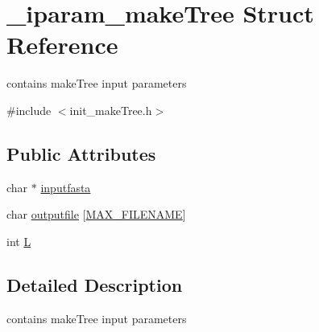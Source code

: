 \hypertarget{struct__iparam__makeTree}{\section{\+\_\+iparam\+\_\+make\+Tree Struct Reference}
\label{struct__iparam__makeTree}
}


contains make\+Tree input parameters  




{\ttfamily \#include $<$init\+\_\+make\+Tree.\+h$>$}

\subsection*{Public Attributes}
\begin{DoxyCompactItemize}
\item 
char $\ast$ \hyperlink{struct__iparam__makeTree_a864d463534785b7f6cc7b9d52664b443}{inputfasta}
\item 
char \hyperlink{struct__iparam__makeTree_a9506dbea307f1fda5cc22c84bc4d035f}{outputfile} \mbox{[}\hyperlink{defines_8h_abe0ec333b60117063f9b9fd9f849cb08}{M\+A\+X\+\_\+\+F\+I\+L\+E\+N\+A\+M\+E}\mbox{]}
\item 
int \hyperlink{struct__iparam__makeTree_a56fd13b9cf051d4770f40b015a295fd3}{L}
\end{DoxyCompactItemize}


\subsection{Detailed Description}
contains make\+Tree input parameters 

